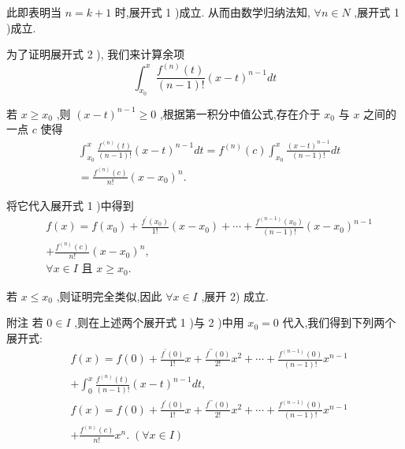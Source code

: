 此即表明当 $n = k + 1$ 时,展开式 1 )成立. 从而由数学归纳法知, $\forall n \in  N$ ,展开式 1 )成立.

为了证明展开式 2 ), 我们来计算余项
$${\int }_{{x}_{0}}^{x}\frac{{f}^{\left( n\right) }\left( t\right) }{\left( {n - 1}\right) !}{\left( x - t\right) }^{n - 1}{dt}$$

若 $x \geq  {x}_{0}$ ,则 ${\left( x - t\right) }^{n - 1} \geq  0$ ,根据第一积分中值公式,存在介于 ${x}_{0}$ 与 $x$ 之间的一点 $c$ 使得
\begin{align*}
	&{\int }_{{x}_{0}}^{x}\frac{{f}^{\left( n\right) }\left( t\right) }{\left( {n - 1}\right) !}{\left( x - t\right) }^{n - 1}{dt} = {f}^{\left( n\right) }\left( c\right) {\int }_{{x}_{0}}^{x}\frac{{\left( x - t\right) }^{n - 1}}{\left( {n - 1}\right) !}{dt}\\
	&= \frac{{f}^{\left( n\right) }\left( c\right) }{n!}{\left( x - {x}_{0}\right) }^{n}.
\end{align*}

将它代入展开式 1 )中得到
\begin{align*}
	&f\left( x\right)  = f\left( {x}_{0}\right)  + \frac{{f}^{\prime }\left( {x}_{0}\right) }{1!}\left( {x - {x}_{0}}\right)  + \cdots  + \frac{{f}^{\left( n - 1\right) }\left( {x}_{0}\right) }{\left( {n - 1}\right) !}{\left( x - {x}_{0}\right) }^{n - 1}\\
	&+ \frac{{f}^{\left( n\right) }\left( c\right) }{n!}{\left( x - {x}_{0}\right) }^{n},\\
	&\forall x \in  I\text{ 且 }x \geq  {x}_{0}.
\end{align*}

若 $x \leq  {x}_{0}$ ,则证明完全类似,因此 $\forall x \in  I$ ,展开 2) 成立.

附注 若 $0 \in  I$ ,则在上述两个展开式 1 )与 2 )中用 ${x}_{0} = 0$ 代入,我们得到下列两个展开式:
\begin{align*}
	&f\left( x\right)  = f\left( 0\right)  + \frac{{f}^{\prime }\left( 0\right) }{1!}x + \frac{{f}^{\prime \prime }\left( 0\right) }{2!}{x}^{2} + \cdots  + \frac{{f}^{\left( n - 1\right) }\left( 0\right) }{\left( {n - 1}\right) !}{x}^{n - 1}\\
	&+ {\int }_{0}^{x}\frac{{f}^{\left( n\right) }\left( t\right) }{\left( {n - 1}\right) !}{\left( x - t\right) }^{n - 1}{dt},\\
	&f\left( x\right)  = f\left( 0\right)  + \frac{{f}^{\prime }\left( 0\right) }{1!}x + \frac{{f}^{\prime \prime }\left( 0\right) }{2!}{x}^{2} + \cdots  + \frac{{f}^{\left( n - 1\right) }\left( 0\right) }{\left( {n - 1}\right) !}{x}^{n - 1}\\
	&+ \frac{{f}^{\left( n\right) }\left( c\right) }{n!}{x}^{n}.\;\left( {\forall x \in  I}\right)
\end{align*}

